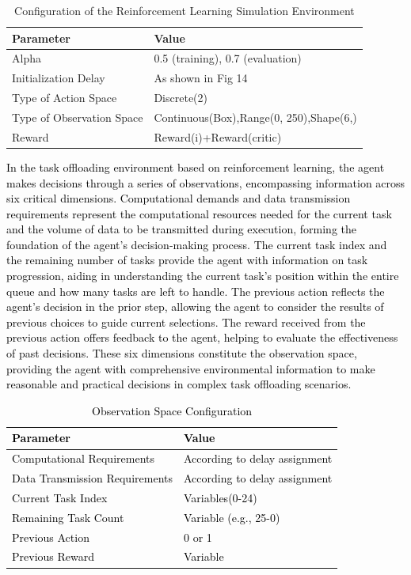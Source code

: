 \documentclass[preprint,12pt]{elsarticle}
\begin{document}
\begin{table}[ht!]
    \begin{tabularx}
    {\textwidth} {m{}<{\raggedright}m{}<{\raggedright}}
    \hline
    \textbf{Parameter} & \textbf{Value} \\
    \hline
    Alpha & 0.5 (training), 0.7 (evaluation)\\
    Initialization Delay & As shown in Fig 14\\
    Type of Action Space & Discrete(2)\\
    Type of Observation Space & Continuous(Box),Range(0, 250),Shape(6,)\\
    Reward & Reward(i)+Reward(critic)\\
    \hline
    \end{tabularx}
    \caption{Configuration of the Reinforcement Learning Simulation Environment}
\end{table}

\textcolor{black}{In the task offloading environment based on reinforcement learning, the agent makes decisions through a series of observations, encompassing information across six critical dimensions. Computational demands and data transmission requirements represent the computational resources needed for the current task and the volume of data to be transmitted during execution, forming the foundation of the agent's decision-making process. The current task index and the remaining number of tasks provide the agent with information on task progression, aiding in understanding the current task's position within the entire queue and how many tasks are left to handle. The previous action reflects the agent's decision in the prior step, allowing the agent to consider the results of previous choices to guide current selections. The reward received from the previous action offers feedback to the agent, helping to evaluate the effectiveness of past decisions. These six dimensions constitute the observation space, providing the agent with comprehensive environmental information to make reasonable and practical decisions in complex task offloading scenarios.}

\textcolor{black}{
\begin{table}[ht!]
    \begin{tabularx}{\textwidth} {m{}<{\raggedright}m{}<{\raggedright}}
    \hline
    \textbf{Parameter} & \textbf{Value} \\
    \hline
    Computational Requirements & According to delay assignment\\
    Data Transmission Requirements & According to delay assignment\\
    Current Task Index & Variables(0-24)\\
    Remaining Task Count & Variable (e.g., 25-0)\\
    Previous Action & 0 or 1\\
    Previous Reward & Variable\\
    \hline
    \end{tabularx}
    \caption{Observation Space Configuration}
\end{table}}
\end{document}
